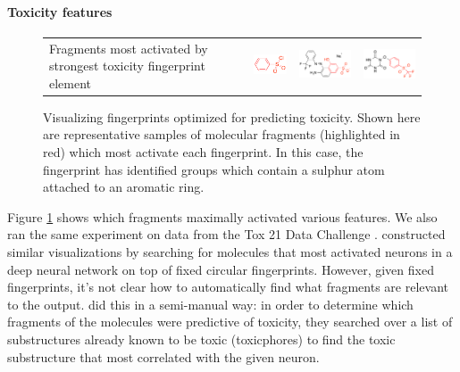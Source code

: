 \documentclass{article}
\begin{document}
\paragraph{Toxicity features}
%
\begin{figure}[h]
\begin{tabular}{>{\centering}m{1in} >{\centering}m{2.2cm} >{\centering}m{3.5cm} >{\centering\arraybackslash}m{3.5cm}}
Fragments most activated by strongest toxicity fingerprint element 
& \includegraphics[width=2.2cm]{figures/jorge-figures/7.png} 
& \includegraphics[width=3.5cm]{figures/jorge-figures/8.png}
& \includegraphics[width=3.5cm]{figures/jorge-figures/9.png}
\end{tabular}
\caption{Visualizing fingerprints optimized for predicting toxicity.
Shown here are representative samples of molecular fragments (highlighted in red) which most activate each fingerprint.
In this case, the fingerprint has identified groups which contain a sulphur atom attached to an aromatic ring.}
\label{fig:learned features toxicity}
\end{figure}
%
Figure \ref{fig:learned features toxicity} shows which fragments maximally activated various features.
We also ran the same experiment on data from the Tox 21 Data Challenge \citet{tox21}.
\citet{unterthiner2015toxicity} constructed similar visualizations by searching for molecules that most activated neurons in a deep neural network on top of fixed circular fingerprints.
However, given fixed fingerprints, it's not clear how to automatically find what fragments are relevant to the output.
\citet{unterthiner2015toxicity} did this in a semi-manual way: in order to determine which fragments of the molecules were predictive of toxicity, they searched over a list of substructures already known to be toxic (toxicphores) to find the toxic substructure that most correlated with the given neuron.
\end{document}
